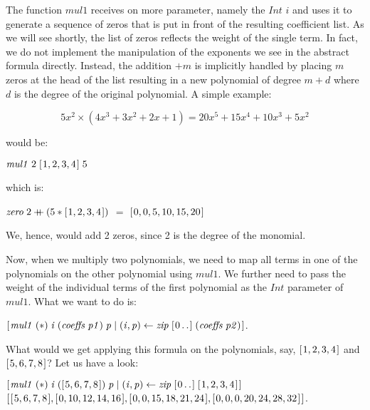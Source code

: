 \documentclass[tikz]{scrreprt}
\newcommand{\Conid}[1]{\mathit{#1}}
\newcommand{\Varid}[1]{\mathit{#1}}
\newcommand{\plus}{\mathbin{+\!\!\!+}}
\begin{document}
The function \ensuremath{\Varid{mul1}} receives on more parameter,
namely the \ensuremath{\Conid{Int}} $i$ and uses it to generate a sequence of zeros
that is put in front of the resulting coefficient list.
As we will see shortly, the list of zeros reflects the weight
of the single term. In fact, we do not implement the manipulation
of the exponents we see in the abstract formula directly.
Instead, the addition $+m$ is implicitly handled by placing
$m$ zeros at the head of the list resulting in a new polynomial
of degree $m+d$ where $d$ is the degree of the original polynomial.
A simple example:

\[
5x^2 \times (4x^3 + 3x^2 + 2x + 1) = 20x^5 + 15x^4 + 10x^3 + 5x^2
\]

would be:

\ensuremath{\Varid{mul1}\;\mathrm{2}\;[\mskip1.5mu \mathrm{1},\mathrm{2},\mathrm{3},\mathrm{4}\mskip1.5mu]\;\mathrm{5}}

which is: 

\ensuremath{\Varid{zero}\;\mathrm{2}\plus (\mathrm{5}\mathbin{*}[\mskip1.5mu \mathrm{1},\mathrm{2},\mathrm{3},\mathrm{4}\mskip1.5mu])} $=$ \ensuremath{[\mskip1.5mu \mathrm{0},\mathrm{0},\mathrm{5},\mathrm{10},\mathrm{15},\mathrm{20}\mskip1.5mu]}

We, hence, would add 2 zeros, since 2 is the degree
of the monomial.

Now, when we multiply two polynomials, we need to map
all terms in one of the polynomials on the other polynomial
using \ensuremath{\Varid{mul1}}. We further need to pass the weight of
the individual terms of the first polynomial as the \ensuremath{\Conid{Int}}
parameter of \ensuremath{\Varid{mul1}}. What we want to do is:

\ensuremath{[\mskip1.5mu \Varid{mul1}\;(\mathbin{*})\;\Varid{i}\;(\Varid{coeffs}\;\Varid{p1})\;\Varid{p}\mid (\Varid{i},\Varid{p})\leftarrow \Varid{zip}\;[\mskip1.5mu \mathrm{0}\mathinner{\ldotp\ldotp}\mskip1.5mu]\;(\Varid{coeffs}\;\Varid{p2})\mskip1.5mu]}.

What would we get applying this formula on
the polynomials, say, 
\ensuremath{[\mskip1.5mu \mathrm{1},\mathrm{2},\mathrm{3},\mathrm{4}\mskip1.5mu]} and \ensuremath{[\mskip1.5mu \mathrm{5},\mathrm{6},\mathrm{7},\mathrm{8}\mskip1.5mu]}?
Let us have a look:

\ensuremath{[\mskip1.5mu \Varid{mul1}\;(\mathbin{*})\;\Varid{i}\;([\mskip1.5mu \mathrm{5},\mathrm{6},\mathrm{7},\mathrm{8}\mskip1.5mu])\;\Varid{p}\mid (\Varid{i},\Varid{p})\leftarrow \Varid{zip}\;[\mskip1.5mu \mathrm{0}\mathinner{\ldotp\ldotp}\mskip1.5mu]\;[\mskip1.5mu \mathrm{1},\mathrm{2},\mathrm{3},\mathrm{4}\mskip1.5mu]\mskip1.5mu]}\\
\ensuremath{[\mskip1.5mu [\mskip1.5mu \mathrm{5},\mathrm{6},\mathrm{7},\mathrm{8}\mskip1.5mu],[\mskip1.5mu \mathrm{0},\mathrm{10},\mathrm{12},\mathrm{14},\mathrm{16}\mskip1.5mu],[\mskip1.5mu \mathrm{0},\mathrm{0},\mathrm{15},\mathrm{18},\mathrm{21},\mathrm{24}\mskip1.5mu],[\mskip1.5mu \mathrm{0},\mathrm{0},\mathrm{0},\mathrm{20},\mathrm{24},\mathrm{28},\mathrm{32}\mskip1.5mu]\mskip1.5mu]}.
\end{document}
